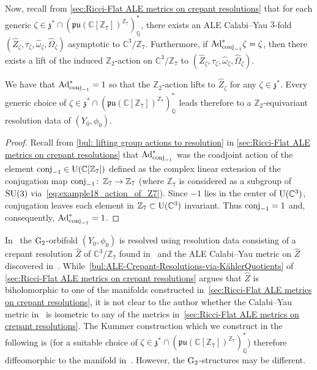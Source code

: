 \documentclass[11pt,a4paper]{scrartcl}
\newcommand{\col}{\colon \thinspace}
\newcommand{\Ad}{\textup{Ad}}
\newcommand{\G}{\textup{G}}
\newcommand{\SU}{\textup{SU}}
\newcommand{\U}{\textup{U}}
\numberwithin{equation}{section}
\theoremstyle{plain}
\theoremstyle{definition}
\theoremstyle{remark}
\begin{document}
Now, recall from \autoref{sec:Ricci-Flat ALE metrics on crepant resolutions} that for each generic $\zeta \in \mathfrak{z}^* \cap (\mathfrak{pu}(\mathbb{C}[\mathbb{Z}_7])^{\mathbb{Z}_7})_\mathbb{Q}^*$, there exists an ALE Calabi--Yau $3$-fold $(\hat{Z}_\zeta,\tau_\zeta,\hat{\omega}_\zeta,\hat{\Omega}_\zeta)$ asymptotic to $\mathbb{C}^3/\mathbb{Z}_7$. Furthermore, if $\Ad_{\textup{conj}_{-1}}^*\zeta = \zeta$, then there exists a lift of the induced $\mathbb{Z}_2$-action on $\mathbb{C}^3/\mathbb{Z}_7$ to $(\hat{Z}_\zeta,\tau_\zeta,\hat{\omega}_\zeta,\hat{\Omega}_\zeta)$.
\begin{lemma}\label{lem:Example18_Z2-action_on_ALE}
We have that $\Ad_{\textup{conj}_{-1}}^* = 1$ so that the $\mathbb{Z}_2$-action lifts to $\hat{Z}_\zeta$ for any $\zeta \in \mathfrak{z}^*$. Every generic choice of $\zeta \in \mathfrak{z}^*\cap (\mathfrak{pu}(\mathbb{C}[\mathbb{Z}_7])^{\mathbb{Z}_7})_\mathbb{Q}^*$ leads therefore to a $\mathbb{Z}_2$-equivariant resolution data of $(Y_0,\phi_0)$.
\end{lemma}
\begin{proof}
Recall from \autoref{bul: lifting group actions to resolution} in \autoref{sec:Ricci-Flat ALE metrics on crepant resolutions} that $\Ad^*_{\textup{conj}_{-1}}$ was the coadjoint action of the element $\textup{conj}_{-1} \in \U(\mathbb{C}[\mathbb{Z}_7])$ defined as the complex linear extension of the conjugation map $\textup{conj}_{-1} \col \mathbb{Z}_7 \to \mathbb{Z}_7$ (where $\mathbb{Z}_7$ is considered as a subgroup of $\SU(3)$ via~\eqref{eq:example18_action_of_Z7}). Since $-1$ lies in the center of $\U(\mathbb{C}^3)$, conjugation leaves each element in $\mathbb{Z}_7 \subset \U(\mathbb{C}^3)$ invariant. Thus $\textup{conj}_{-1} =1 $ and, consequently, $\Ad_{\textup{conj}_{-1}}^* = 1$.
\end{proof}

\begin{remark}
In~\cite[Example~18]{Joyce-GeneralisedKummer2} the $\G_2$-orbifold $(Y_0,\phi_0)$ is resolved using resolution data consisting of a crepant resolution $\hat{Z}$ of $\mathbb{C}^3/\mathbb{Z}_7$ found in~\cite[Example~3]{Markushevich-examples-resolutions} and the ALE Calabi--Yau metric on $\hat{Z}$ 
discovered in~\cite{TianYau-Complete-RicciFlat-Kaehler-Mfds}. While~\autoref{bul:ALE-Crepant-Resolutions-via-KählerQuotients} of \autoref{sec:Ricci-Flat ALE metrics on crepant resolutions} argues that $\hat{Z}$ is biholomorphic to one of the manifolds constructed in~\autoref{sec:Ricci-Flat ALE metrics on crepant resolutions}, it is not clear to the author whether the Calabi--Yau metric 
in~\cite{TianYau-Complete-RicciFlat-Kaehler-Mfds} is isometric to any of the metrics in~\autoref{sec:Ricci-Flat ALE metrics on crepant resolutions}. The Kummer construction which we construct in the following is (for a suitable choice of $\zeta \in \mathfrak{z}^*\cap (\mathfrak{pu}(\mathbb{C}[\mathbb{Z}_7])^{\mathbb{Z}_7})_\mathbb{Q}^*$) therefore diffeomorphic to the manifold in~\cite[Example~18]{Joyce-GeneralisedKummer2}. However, the $\G_2$-structures may be different.
\end{remark}
\end{document}
